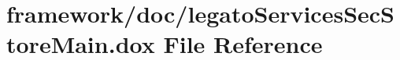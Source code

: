 \hypertarget{legato_services_sec_store_main_8dox}{}\section{framework/doc/legato\+Services\+Sec\+Store\+Main.dox File Reference}
\label{legato_services_sec_store_main_8dox}
